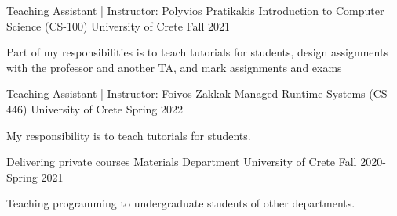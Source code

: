 


\begin{cventries}

  \cventry
    {Teaching Assistant | Instructor: Polyvios Pratikakis} %
    {Introduction to Computer Science (CS-100)} %
    {University of Crete} %
    {Fall 2021} %
    {
      \begin{cvitems} %
        \item{Part of my responsibilities is to teach tutorials for
            students, design assignments with the professor and
              another TA, and mark assignments and exams}
      \end{cvitems}
    }

  \cventry
    {Teaching Assistant | Instructor: Foivos Zakkak} %
    {Managed Runtime Systems (CS-446)} %
    {University of Crete} %
    {Spring 2022} %
    {
      \begin{cvitems} %
        \item{My responsibility is to teach tutorials for
            students.}
      \end{cvitems}
    }


  \cventry
    {Delivering private courses} %
    {Materials Department} %
    {University of Crete} %
    {Fall 2020-Spring 2021} %
    {
      \begin{cvitems}
        \item{Teaching programming to undergraduate students of other departments.}
      \end{cvitems}
    }

\end{cventries}
